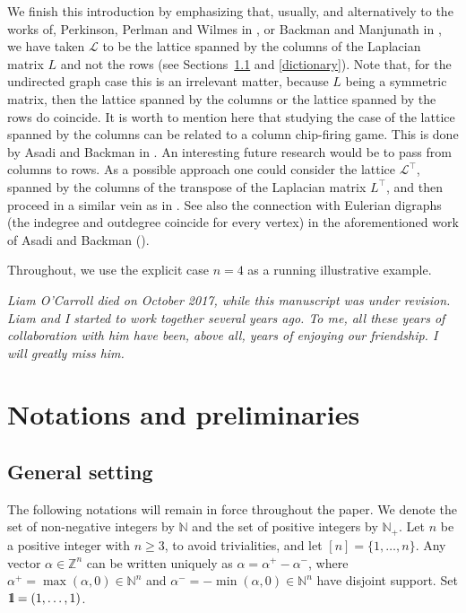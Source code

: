 \documentclass[ALCO]{cedram}
\newcommand{\mbn}{\mbox{$\mathbb{N}$}}
\newcommand{\mbz}{\mbox{$\mathbb{Z}$}}
\newcommand{\mbone}{\mbox{$1\mkern-4.6mu {\rm l}$}}
\newcommand{\mcl}{\mbox{$\mathcal{L}$}}
\begin{document}
We finish this introduction by emphasizing that, usually, and
alternatively to the works of, \eg Perkinson, Perlman and Wilmes in
\cite{ppw}, or Backman and Manjunath in \cite{bm}, we have taken
$\mcl$ to be the lattice spanned by the columns of the Laplacian
matrix $L$ and not the rows (see Sections~\ref{general} and
\ref{dictionary}). Note that, for the undirected graph case this is an
irrelevant matter, because $L$ being a symmetric matrix, then the
lattice spanned by the columns or the lattice spanned by the rows do
coincide. It is worth to mention here that studying the case of the
lattice spanned by the columns can be related to a column chip-firing
game. This is done by Asadi and Backman in \cite[Introduction and
  Section~3.2]{ab}. An interesting future research would be to pass
from columns to rows. As a possible approach one could consider the
lattice $\mcl^{\top}$, spanned by the columns of the transpose of the
Laplacian matrix $L^{\top}$, and then proceed in a similar vein as in
\cite{opv}. See also the connection with Eulerian digraphs (the
indegree and outdegree coincide for every vertex) in the
aforementioned work of Asadi and Backman (\cite[Theorem~3.18]{ab}).

Throughout, we use the explicit case $n=4$ as a running illustrative
example.

\bigskip 

\textit{Liam O'Carroll died on October 2017, while this manuscript was under
revision. Liam and I started to work together several years ago. To
me, all these years of collaboration with him have been, above all,
years of enjoying our friendship. I will greatly miss him.}


\section{Notations and preliminaries}\label{preliminaries}

\subsection{General setting}\label{general}

The following notations will remain in force throughout the paper.  We
denote the set of non-negative integers by $\mbn$ and the set of
positive integers by $\mbn_+$. Let $n$ be a positive integer with
$n\geq 3$, to avoid trivialities, and let $[n]=\{1,\ldots ,n\}$. Any
vector $\alpha\in\mbz^n$ can be written uniquely as
$\alpha=\alpha^+-\alpha^-$, where $\alpha^+=\max(\alpha,0)\in\mbn^n$
and $\alpha^-=-\min(\alpha,0)\in\mbn^n$ have disjoint support. Set
$\mbone=(1,\ldots ,1)$. 
\end{document}
